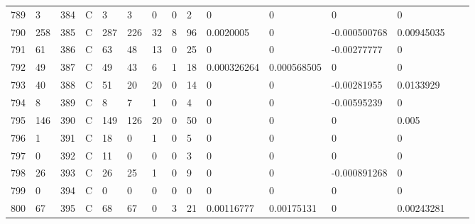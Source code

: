 \begin{longtable}{lllllllllllllll}
	789 & 3                 & 384 & C   & 3                 & 3                 & 0                 & 0    & 2          & 0              & 0              & 0             & 0            \\
	790 & 258               & 385 & C   & 287               & 226               & 32                & 8    & 96         & 0.0020005      & 0              & -0.000500768  & 0.00945035   \\
	791 & 61                & 386 & C   & 63                & 48                & 13                & 0    & 25         & 0              & 0              & -0.00277777   & 0            \\
	792 & 49                & 387 & C   & 49                & 43                & 6                 & 1    & 18         & 0.000326264    & 0.000568505    & 0             & 0            \\
	793 & 40                & 388 & C   & 51                & 20                & 20                & 0    & 14         & 0              & 0              & -0.00281955   & 0.0133929    \\
	794 & 8                 & 389 & C   & 8                 & 7                 & 1                 & 0    & 4          & 0              & 0              & -0.00595239   & 0            \\
	795 & 146               & 390 & C   & 149               & 126               & 20                & 0    & 50         & 0              & 0              & 0             & 0.005        \\
	796 & 1                 & 391 & C   & 18                & 0                 & 1                 & 0    & 5          & 0              & 0              & 0             & 0            \\
	797 & 0                 & 392 & C   & 11                & 0                 & 0                 & 0    & 3          & 0              & 0              & 0             & 0            \\
	798 & 26                & 393 & C   & 26                & 25                & 1                 & 0    & 9          & 0              & 0              & -0.000891268  & 0            \\
	799 & 0                 & 394 & C   & 0                 & 0                 & 0                 & 0    & 0          & 0              & 0              & 0             & 0            \\
	800 & 67                & 395 & C   & 68                & 67                & 0                 & 3    & 21         & 0.00116777     & 0.00175131     & 0             & 0.00243281   \\

\end{longtable}
